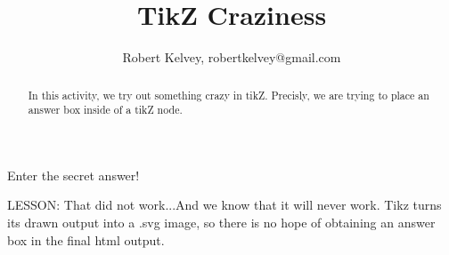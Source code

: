 \documentclass{ximera}
\title{TikZ Craziness}
\author{Robert Kelvey, robertkelvey@gmail.com}
\begin{document}
\begin{abstract}
    In this activity, we try out something crazy in tikZ. Precisly, we are trying to place an answer box inside of a tikZ node.
\end{abstract}

\maketitle

\begin{question}
Enter the secret answer!

\begin{center}
    
\end{center}


\end{question}

LESSON: That did not work...And we know that it will never work. Tikz turns its drawn output into a .svg image, so there is no hope of obtaining an answer box in the final html output. 
\end{document}
